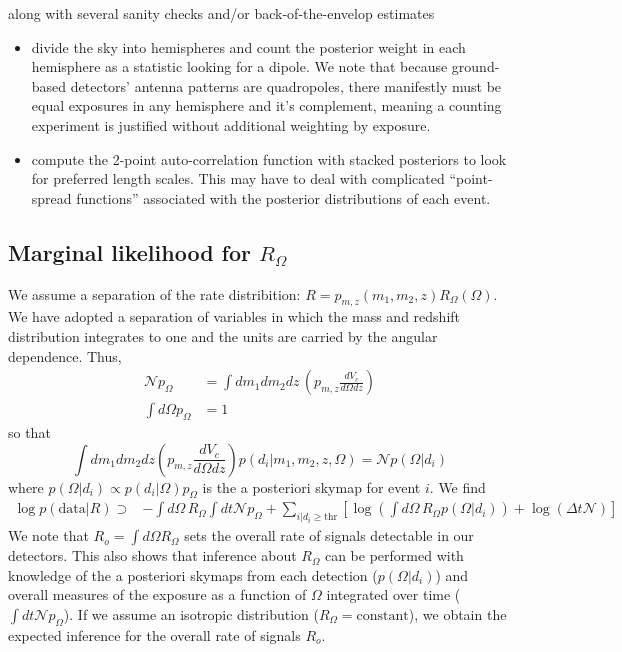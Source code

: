 \documentclass{article}
\begin{document}
along with several sanity checks and/or back-of-the-envelop estimates
\begin{itemize}
    \item divide the sky into hemispheres and count the posterior weight in each hemisphere as a statistic looking for a dipole. We note that because ground-based detectors' antenna patterns are quadropoles, there manifestly must be equal exposures in any hemisphere and it's complement, meaning a counting experiment is justified without additional weighting by exposure.
    \item compute the 2-point auto-correlation function with stacked posteriors to look for preferred length scales. This may have to deal with complicated ``point-spread functions'' associated with the posterior distributions of each event.
\end{itemize}


\subsection*{Marginal likelihood for $R_\Omega$}

We assume a separation of the rate distribition: $R = p_{m,z}(m_1, m_2, z) R_\Omega(\Omega)$.
We have adopted a separation of variables in which the mass and redshift distribution integrates to one and the units are carried by the angular dependence.
Thus,
\begin{align}
    \mathcal{N} p_\Omega & = \int dm_1 dm_2 dz\, \left(p_{m,z} \frac{dV_c}{d\Omega dz} \right) \\
    \int d\Omega p_\Omega & = 1
\end{align}
so that
\begin{equation}
    \int dm_1 dm_2 dz \left( p_{m,z}\frac{dV_c}{d\Omega dz} \right) p(d_i|m_1, m_2, z, \Omega) = \mathcal{N} p(\Omega|d_i)
\end{equation}
where $p(\Omega|d_i)\propto p(d_i|\Omega)p_\Omega$ is the a posteriori skymap for event $i$.
We find
\begin{align}
    \log p(\mathrm{data}|R) \supset & - \int d\Omega\, R_\Omega \int dt \mathcal{N} p_\Omega + \sum\limits_{i|d_i\geq\mathrm{thr}} \left[ \log\left(\int d\Omega\, R_\Omega p(\Omega|d_i)\right) + \log\left(\Delta t \mathcal{N}\right) \right] 
\end{align}
We note that $R_o = \int d\Omega R_\Omega$ sets the overall rate of signals detectable in our detectors.
This also shows that inference about $R_\Omega$ can be performed with knowledge of the a posteriori skymaps from each detection ($p(\Omega|d_i)$) and overall measures of the exposure as a function of $\Omega$ integrated over time ($\int dt \mathcal{N} p_\Omega$).
If we assume an isotropic distribution ($R_\Omega = \text{constant}$), we obtain the expected inference for the overall rate of signals $R_o$.
\end{document}
